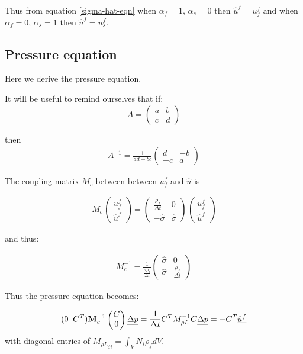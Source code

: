 Thus from equation \ref{sigma-hat-eqn} when $\alpha_f=1$, $\alpha_s=0$ 
then $\hat u^f=u_f^f$ and when $\alpha_f=0$, 
$\alpha_s=1$ then $\hat u^f=u_s^f$.  


\subsection{Pressure equation}
Here we derive the pressure equation. 

It will be useful to remind ourselves that if:
\begin{equation}
A=
\begin{pmatrix}
 a & b \\ c & d
\end{pmatrix} 
\end{equation}

then
\begin{eqnarray}
A^{-1} =\frac{1}{ad-bc}
\begin{pmatrix}
  d & -b \\ -c & a 
\end{pmatrix} 
\end{eqnarray}

The coupling matrix $M_c$ between between $u_f^f$ and $\hat u$ is

\begin{eqnarray}
M_c 
\begin{pmatrix}
u_f^f \\ \hat u^f
\end{pmatrix}  
=
\begin{pmatrix}
\frac{\rho_f}{\Delta t}  & 0 \\ 
-\hat\sigma  &\hat\sigma 
\end{pmatrix} 
\begin{pmatrix}
u_f^f \\ \hat u^f
\end{pmatrix}  
\end{eqnarray}

and thus:

\begin{eqnarray}
M_c^{-1}=\frac{1}{ \frac{\hat\sigma\rho_f}{\Delta t}} 
\begin{pmatrix}
\hat\sigma  & 0 \\ 
 \hat\sigma  & \frac{\rho_f}{\Delta t} 
\end{pmatrix}  
\end{eqnarray}

Thus the pressure equation becomes:

\begin{eqnarray}
(0 \;\; C^T) {\bf M}_c^{-1} 
\begin{pmatrix}
 C \\ 0  
\end{pmatrix}  
\underline{\Delta p} 
= \frac{1}{\Delta t} 
C^T M_{\rho L}^{-1} C \underline{\Delta p}= - C^T \underline{ \hat u^f }
\label{delt-p-classic27}
\end{eqnarray} 
with diagonal entries of ${M_{\rho L}}_{ii}=\int_V N_i \rho_f dV$.

